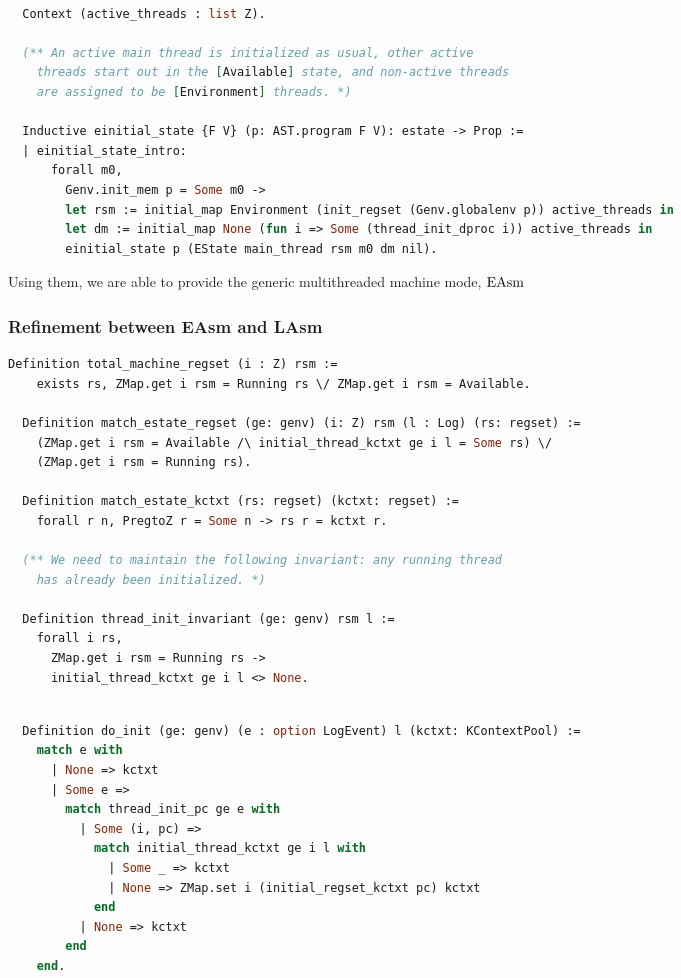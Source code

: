 \begin{lstlisting}[language=Caml]

  Context (active_threads : list Z).

  (** An active main thread is initialized as usual, other active
    threads start out in the [Available] state, and non-active threads
    are assigned to be [Environment] threads. *)

  Inductive einitial_state {F V} (p: AST.program F V): estate -> Prop :=
  | einitial_state_intro: 
      forall m0,
        Genv.init_mem p = Some m0 ->
        let rsm := initial_map Environment (init_regset (Genv.globalenv p)) active_threads in
        let dm := initial_map None (fun i => Some (thread_init_dproc i)) active_threads in
        einitial_state p (EState main_thread rsm m0 dm nil).
\end{lstlisting}

Using them, we are able to provide the generic multithreaded machine mode, $\mathrm{EAsm}$


\subsubsection{Refinement between EAsm and LAsm}


\begin{lstlisting}[language=Caml]
  Definition total_machine_regset (i : Z) rsm :=
    exists rs, ZMap.get i rsm = Running rs \/ ZMap.get i rsm = Available.

  Definition match_estate_regset (ge: genv) (i: Z) rsm (l : Log) (rs: regset) :=
    (ZMap.get i rsm = Available /\ initial_thread_kctxt ge i l = Some rs) \/
    (ZMap.get i rsm = Running rs).
  
  Definition match_estate_kctxt (rs: regset) (kctxt: regset) :=
    forall r n, PregtoZ r = Some n -> rs r = kctxt r.

  (** We need to maintain the following invariant: any running thread
    has already been initialized. *)

  Definition thread_init_invariant (ge: genv) rsm l :=
    forall i rs,
      ZMap.get i rsm = Running rs ->
      initial_thread_kctxt ge i l <> None.
\end{lstlisting}


\begin{lstlisting}[language=Caml]

  Definition do_init (ge: genv) (e : option LogEvent) l (kctxt: KContextPool) :=
    match e with
      | None => kctxt
      | Some e =>
        match thread_init_pc ge e with
          | Some (i, pc) =>
            match initial_thread_kctxt ge i l with
              | Some _ => kctxt
              | None => ZMap.set i (initial_regset_kctxt pc) kctxt
            end
          | None => kctxt
        end
    end.
\end{lstlisting}


